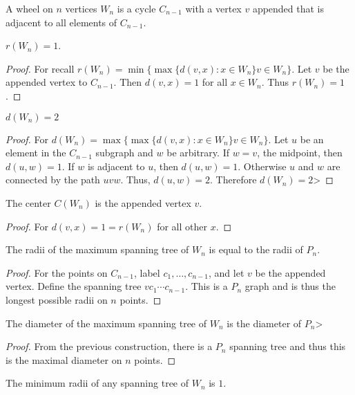 \documentclass[crop=false,class=book]{standalone}
\begin{document}
\begin{definition}
A wheel on $n$ vertices $W_n$ is a cycle $C_{n-1}$ with a vertex $v$ appended that is adjacent to all elements of $C_{n-1}$.
\end{definition}
\begin{corollary}
$r(W_n) = 1$.
\end{corollary}
\begin{proof}
For recall $r(W_n) = \min\{\max\{d(v,x):x\in W_n\}v\in W_n\}$. Let $v$ be the appended vertex to $C_{n-1}$. Then $d(v,x) = 1$ for all $x\in W_n$. Thus $r(W_n) = 1$.
\end{proof}
\begin{corollary}
$d(W_n) = 2$
\end{corollary}
\begin{proof}
For $d(W_n) = \max\{\max\{d(v,x):x\in W_n\}v\in W_n\}$. Let $u$ be an element in the $C_{n-1}$ subgraph and $w$ be arbitrary. If $w= v$, the midpoint, then $d(u,w) = 1$. If $w$ is adjacent to $u$, then $d(u,w) = 1$. Otherwise $u$ and $w$ are connected by the path $uvw$. Thus, $d(u,w) = 2$. Therefore $d(W_n) = 2$>
\end{proof}
\begin{corollary}
The center $C(W_n)$ is the appended vertex $v$.
\end{corollary}
\begin{proof}
For $d(v,x) = 1 = r(W_n)$ for all other $x$.
\end{proof}
\begin{corollary}
The radii of the maximum spanning tree of $W_n$ is equal to the radii of $P_n$.
\end{corollary}
\begin{proof}
For the points on $C_{n-1}$, label $c_1,\hdots, c_{n-1}$, and let $v$ be the appended vertex. Define the spanning tree $vc_1\cdots c_{n-1}$. This is a $P_n$ graph and is thus the longest possible radii on $n$ points.
\end{proof}
\begin{corollary}
The diameter of the maximum spanning tree of $W_n$ is the diameter of $P_n$>
\end{corollary}
\begin{proof}
From the previous construction, there is a $P_n$ spanning tree and thus this is the maximal diameter on $n$ points.
\end{proof}
\begin{corollary}
The minimum radii of any spanning tree of $W_n$ is $1$.
\end{corollary}
\end{document}
